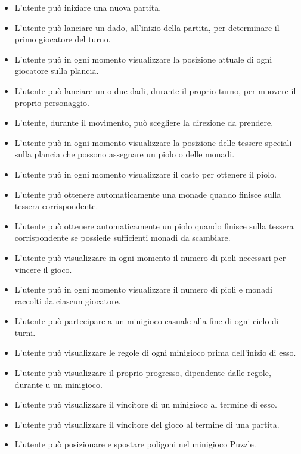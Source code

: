\begin{itemize}
      \item L'utente può iniziare una nuova partita.
      \item L'utente può lanciare un dado, all'inizio della partita, per determinare il 
            primo giocatore del turno.
      \item L'utente può in ogni momento visualizzare la posizione attuale di ogni giocatore
            sulla plancia.
      \item L'utente può lanciare un o due dadi, durante il proprio turno, per muovere il proprio
            personaggio.
      \item L'utente, durante il movimento, può scegliere la direzione da prendere.
      \item L'utente può in ogni momento visualizzare la posizione delle tessere speciali sulla
            plancia che possono assegnare un piolo o delle monadi.
      \item L'utente può in ogni momento visualizzare il costo per ottenere il piolo.
      \item L'utente può ottenere automaticamente una monade quando finisce sulla tessera 
            corrispondente.
      \item L'utente può ottenere automaticamente un piolo quando finisce sulla tessera 
            corrispondente se possiede sufficienti monadi da scambiare.
      \item L'utente può visualizzare in ogni momento il numero di pioli necessari per vincere 
            il gioco.
      \item L'utente può in ogni momento visualizzare il numero di pioli e monadi raccolti 
            da ciascun giocatore.
      \item L'utente può partecipare a un minigioco casuale alla fine di ogni ciclo di turni.
      \item L'utente può visualizzare le regole di ogni minigioco prima dell'inizio di esso.
      \item L'utente può visualizzare il proprio progresso, dipendente dalle regole, durante u
            un minigioco.
      \item L'utente può visualizzare il vincitore di un minigioco al termine di esso.
      \item L'utente può visualizzare il vincitore del gioco al termine di una partita.
      \item L'utente può posizionare e spostare poligoni nel minigioco Puzzle.
\end{itemize}

